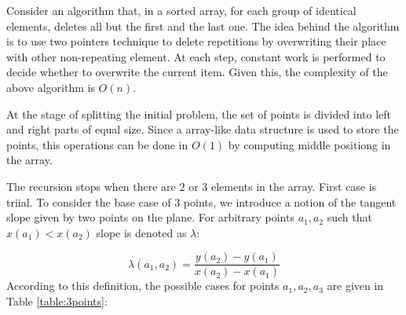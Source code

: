 \documentclass[a4paper,english,numberwithinsect,notab]{eurocg20-submission}
\begin{document}
	Consider an algorithm that, in a sorted array, for each group of identical elements, deletes all but the first and the last one. The idea behind the algorithm is to use two pointers technique to delete repetitions by overwriting their place with other non-repeating element. At each step, constant work is performed to decide whether to overwrite the current item. Given this, the complexity of the above algorithm is $O(n)$.
	
	
	
	
	
	
	At the stage of splitting the initial problem, the set of points is divided into left and right parts of equal size. Since a array-like data structure is used to store the points, this operations can be done in $O(1)$ by computing middle positiong in the array.
	
	The recursion stops when there are $2$ or $3$ elements in the array. First case is triial. To consider the base case of $3$ points, we introduce a notion of the tangent slope given by two points on the plane. For arbitrary points $a_1, a_2$ such that $x(a_1)<x(a_2)$ slope is denoted as $\lambda$:
	
	\begin{equation}
	\lambda(a_1, a_2)=\frac{y(a_2)-y(a_1)}{x(a_2)-x(a_1)}
	\end{equation}
	According to this definition, the possible cases for points $a_1,a_2,a_3$ are given in Table \ref{table:3points}:
	
\end{document}
